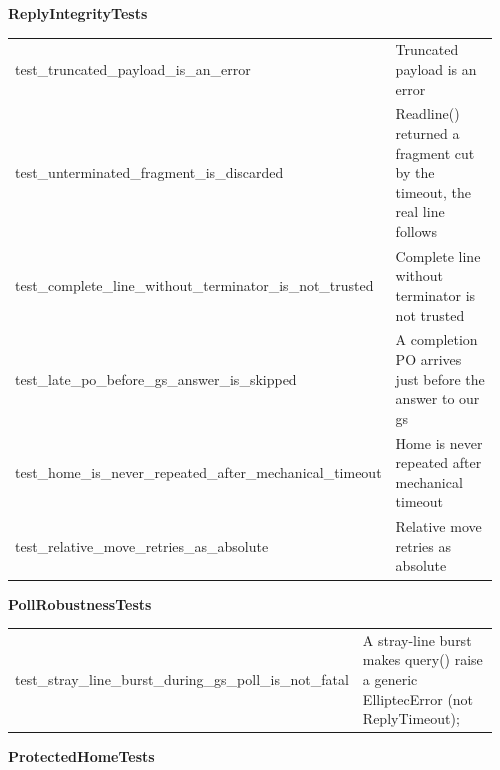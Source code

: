 \par\smallskip \textbf{ReplyIntegrityTests} \par\nopagebreak\smallskip
\begin{longtable}{@{}>{\ttfamily\scriptsize\raggedright\arraybackslash}p{0.40\linewidth} >{\footnotesize\raggedright\arraybackslash}p{0.555\linewidth}@{}}
test\_\allowbreak{}truncated\_\allowbreak{}payload\_\allowbreak{}is\_\allowbreak{}an\_\allowbreak{}error & Truncated payload is an error \\
test\_\allowbreak{}unterminated\_\allowbreak{}fragment\_\allowbreak{}is\_\allowbreak{}discarded & Readline() returned a fragment cut by the timeout, the real line follows \\
test\_\allowbreak{}complete\_\allowbreak{}line\_\allowbreak{}without\_\allowbreak{}terminator\_\allowbreak{}is\_\allowbreak{}not\_\allowbreak{}trusted & Complete line without terminator is not trusted \\
test\_\allowbreak{}late\_\allowbreak{}po\_\allowbreak{}before\_\allowbreak{}gs\_\allowbreak{}answer\_\allowbreak{}is\_\allowbreak{}skipped & A completion PO arrives just before the answer to our gs \\
test\_\allowbreak{}home\_\allowbreak{}is\_\allowbreak{}never\_\allowbreak{}repeated\_\allowbreak{}after\_\allowbreak{}mechanical\_\allowbreak{}timeout & Home is never repeated after mechanical timeout \\
test\_\allowbreak{}relative\_\allowbreak{}move\_\allowbreak{}retries\_\allowbreak{}as\_\allowbreak{}absolute & Relative move retries as absolute \\
\end{longtable}
\par\smallskip \textbf{PollRobustnessTests}\par\nopagebreak\smallskip
\begin{longtable}{@{}>{\ttfamily\scriptsize\raggedright\arraybackslash}p{0.40\linewidth} >{\footnotesize\raggedright\arraybackslash}p{0.555\linewidth}@{}}
test\_\allowbreak{}stray\_\allowbreak{}line\_\allowbreak{}burst\_\allowbreak{}during\_\allowbreak{}gs\_\allowbreak{}poll\_\allowbreak{}is\_\allowbreak{}not\_\allowbreak{}fatal & A stray-line burst makes query() raise a generic ElliptecError (not ReplyTimeout); \\
\end{longtable}
\par\smallskip \textbf{ProtectedHomeTests}\par\nopagebreak\smallskip
